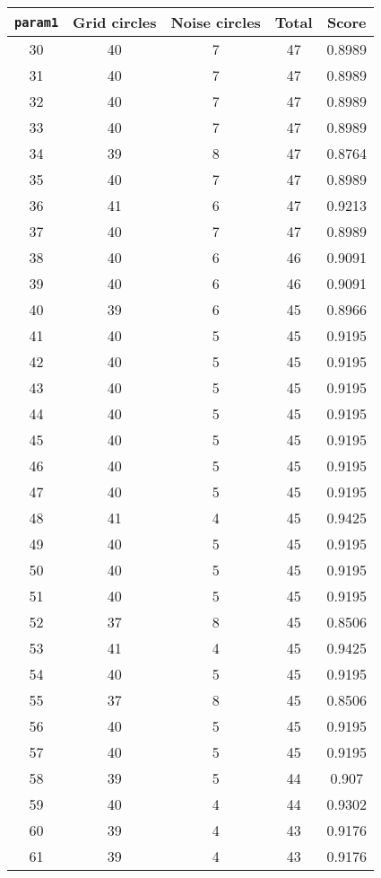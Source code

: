 \documentclass[letterpaper, 12pt]{article}
\begin{document}
\begin{longtable}{|c|c|c|c|c|}
\hline
\textbf{\texttt{param1}} & \textbf{Grid circles} & \textbf{Noise circles} & \textbf{Total} & \textbf{Score} \\
\hline
30 & 40 & 7 & 47 & 0.8989 \\
\hline
31 & 40 & 7 & 47 & 0.8989 \\
\hline
32 & 40 & 7 & 47 & 0.8989 \\
\hline
33 & 40 & 7 & 47 & 0.8989 \\
\hline
34 & 39 & 8 & 47 & 0.8764 \\
\hline
35 & 40 & 7 & 47 & 0.8989 \\
\hline
36 & 41 & 6 & 47 & 0.9213 \\
\hline
37 & 40 & 7 & 47 & 0.8989 \\
\hline
38 & 40 & 6 & 46 & 0.9091 \\
\hline
39 & 40 & 6 & 46 & 0.9091 \\
\hline
40 & 39 & 6 & 45 & 0.8966 \\
\hline
41 & 40 & 5 & 45 & 0.9195 \\
\hline
42 & 40 & 5 & 45 & 0.9195 \\
\hline
43 & 40 & 5 & 45 & 0.9195 \\
\hline
44 & 40 & 5 & 45 & 0.9195 \\
\hline
45 & 40 & 5 & 45 & 0.9195 \\
\hline
46 & 40 & 5 & 45 & 0.9195 \\
\hline
47 & 40 & 5 & 45 & 0.9195 \\
\hline
48 & 41 & 4 & 45 & 0.9425 \\
\hline
49 & 40 & 5 & 45 & 0.9195 \\
\hline
50 & 40 & 5 & 45 & 0.9195 \\
\hline
51 & 40 & 5 & 45 & 0.9195 \\
\hline
52 & 37 & 8 & 45 & 0.8506 \\
\hline
53 & 41 & 4 & 45 & 0.9425 \\
\hline
54 & 40 & 5 & 45 & 0.9195 \\
\hline
55 & 37 & 8 & 45 & 0.8506 \\
\hline
56 & 40 & 5 & 45 & 0.9195 \\
\hline
57 & 40 & 5 & 45 & 0.9195 \\
\hline
58 & 39 & 5 & 44 & 0.907 \\
\hline
59 & 40 & 4 & 44 & 0.9302 \\
\hline
60 & 39 & 4 & 43 & 0.9176 \\
\hline
61 & 39 & 4 & 43 & 0.9176 \\

\end{longtable}
\end{document}
